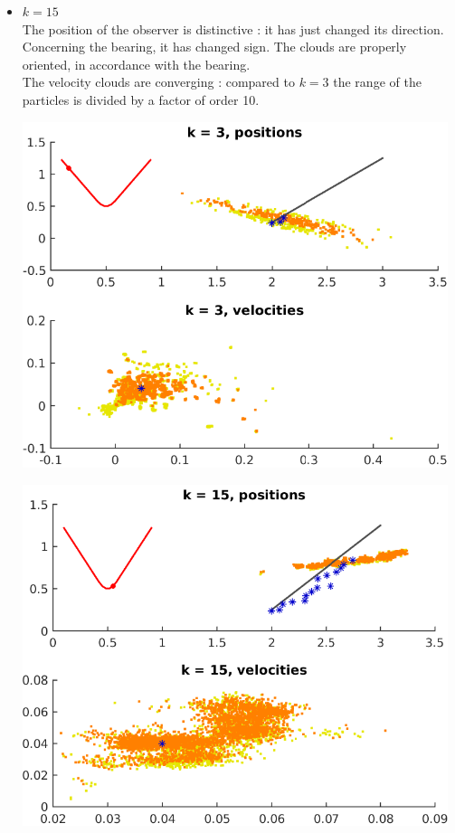 \documentclass[english,DIV=13]{scrreprt}
\begin{document}
\begin{itemize}
\item $k=15$\\
The position of the observer is distinctive : it has just changed its direction. Concerning the bearing,
it has changed sign. The clouds are properly oriented, in accordance with the bearing.\\
The velocity clouds are converging : compared to $k=3$ the range of the particles is divided by a factor of order 10.

  \begin{center}
	\begin{minipage}{.5\textwidth}
   		\includegraphics[width=0.98\textwidth]{img/q4_3.png}
	\end{minipage}%
	\begin{minipage}{.5\textwidth}
		 \includegraphics[width=0.98\textwidth]{img/q4_15.png}

\end{minipage}
\end{center}
\end{itemize}
\end{document}
